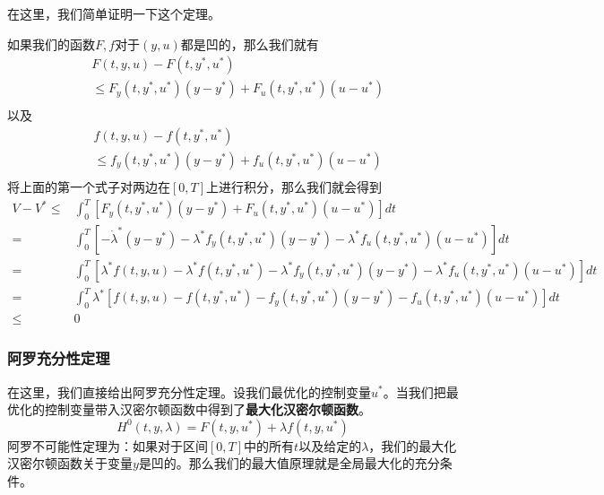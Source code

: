 \documentclass[UTF8,12pt]{ctexart}
\numberwithin{equation}{section} %
\numberwithin{figure}{section}
\numberwithin{table}{section}
\begin{document}
	在这里，我们简单证明一下这个定理。
	
	如果我们的函数$F,f$对于$(y,u)$都是凹的，那么我们就有
	\begin{equation}
		\begin{aligned}
			&F(t,y,u) - F(t,y^*,u
			^{*}) \\
			& \leqslant  F_y(t,y^*,u^{*})(y - y^*) +  F_{u}(t,y^*,u^{*})(u - u^{*}) \\
		\end{aligned}
	\end{equation}
	以及
	\begin{equation}
		\begin{aligned}
			&f(t,y,u) - f(t,y^*,u
			^{*}) \\
			& \leqslant  f_y(t,y^*,u^{*})(y - y^*) +  f_{u}(t,y^*,u^{*})(u - u^{*}) \\
		\end{aligned}
	\end{equation}
	将上面的第一个式子对两边在$[0,T]$上进行积分，那么我们就会得到
	\begin{equation}
		\begin{aligned}
			V - V^* \leqslant & \int_{0}^{T}[F_y(t,y^*,u^{*})(y - y^*) +  F_{u}(t,y^*,u^{*})(u - u^{*})]dt \\
			=&\int_{0}^{T}[
			-\dot{\lambda}^*(y - y^*) 
			- \lambda^*f_y(t,y^*,u^*)(y-y^*)
			-\lambda^*f_u(t,y^*,u^*)(u - u^*)]dt \\
			=&\int_{0}^{T}[
			\lambda^*f(t,y,u) - \lambda^*f(t,y^*,u^*) 
			- \lambda^*f_y(t,y^*,u^*)(y-y^*)
			-\lambda^*f_u(t,y^*,u^*)(u - u^*)]dt \\
			=&\int_{0}^{T}\lambda^*[
			f(t,y,u) - f(t,y^*,u^*) 
			- f_y(t,y^*,u^*)(y-y^*)
			-f_u(t,y^*,u^*)(u - u^*)]dt\\
			\leqslant& 0
		\end{aligned}
	\end{equation}
	
	\subsubsection{阿罗充分性定理}
	在这里，我们直接给出阿罗充分性定理。设我们最优化的控制变量$u^*$。当我们把最优化的控制变量带入汉密尔顿函数中得到了\textbf{最大化汉密尔顿函数}。
	\begin{equation}
		H^0(t,y,\lambda) = F(t,y,u^*) + \lambda f(t,y,u^*)
	\end{equation}
	阿罗不可能性定理为：如果对于区间$[0,T]$中的所有$t$以及给定的$\lambda$，我们的最大化汉密尔顿函数关于变量$y$是凹的。那么我们的最大值原理就是全局最大化的充分条件。
	
\end{document}

